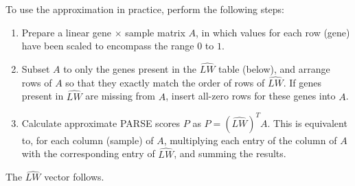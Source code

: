 To use the approximation in practice, perform the following steps:
\begin{enumerate}
  \item Prepare a linear gene $\times$ sample matrix $A$, in which values for each row (gene) have been scaled to encompass the range $0$ to $1$.
  \item Subset $A$ to only the genes present in the $\widehat{LW}$ table (below), and arrange rows of $A$ so that they exactly match the order of rows of $\widehat{LW}$.  If genes present in $\widehat{LW}$ are missing from $A$, insert all-zero rows for these genes into $A$.
  \item Calculate approximate \gls{PARSE} scores $P$ as $P = \left(\widehat{LW}\right)^T A$.  This is equivalent to, for each column (sample) of $A$, multiplying each entry of the column of $A$ with the corresponding entry of $\widehat{LW}$, and summing the results.
\end{enumerate}

The $\widehat{LW}$ vector follows.

